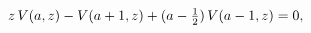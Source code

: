 \[z\mathop{V\/}\nolimits\!\left(a,z\right)-\mathop{V\/}\nolimits\!\left(a+1,z%
\right)+(a-\tfrac{1}{2})\mathop{V\/}\nolimits\!\left(a-1,z\right)=0,\]